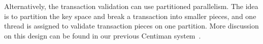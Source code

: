 Alternatively, the transaction validation can use partitioned parallelism. The idea is to partition the key space and break a transaction into smaller pieces, and one thread is assigned to validate transaction pieces on one partition. More discussion on this design can be found in our previous Centiman system~\cite{ding2015centiman}.
